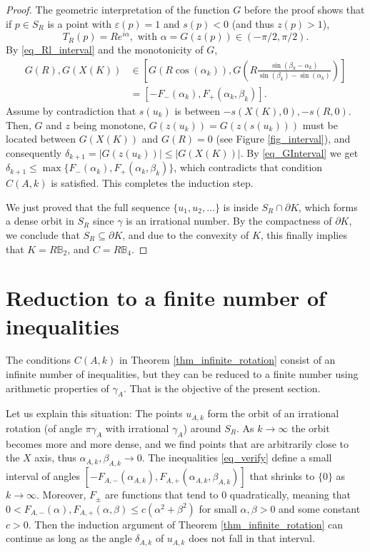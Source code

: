 \documentclass{amsart}
\def \B{\mathbb B}
\begin{document}
\begin{proof}
	The geometric interpretation of the function $G$ before the proof shows that if $p \in S_R$ is a point with $\varepsilon(p) = 1$ and $s(p)<0$ (and thus $z(p)>1$),
	\[T_R(p) = R e^{i \alpha}, \text{ with } \alpha = G(z(p)) \in (-\pi/2, \pi/2) .\]
	By \eqref{eq_Rl_interval} and the monotonicity of $G$, 
	\begin{align}
		\label{eq_GInterval}
		G(R), G(X(K)) 
		&\in [G(R \cos(\alpha_k)), G(R\frac {\sin(\beta_k-\alpha_k)}{\sin(\beta_k) - \sin(\alpha_k)})] \\
		&= [-F_-(\alpha_k), F_+(\alpha_k,\beta_k)].
	\end{align}
	Assume by contradiction that $s(u_k)$ is between $-s(X(K),0),-s(R,0)$. Then, $G$ and $z$ being monotone, $G(z(u_k)) = G(z(s(u_k)))$ must be located between $G(X(K))$ and $G(R)=0$ (see Figure \ref{fig_interval}), and consequently $\delta_{k+1} = |G(z(u_k))| \leq |G(X(K))|$.
	By \eqref{eq_GInterval} we get $\delta_{k+1} \leq \max\{F_-(\alpha_k), F_+(\alpha_k,\beta_k)\}$, which contradicts that condition $C(A,k)$ is satisfied. This completes the induction step.

	We just proved that the full sequence $\{u_1, u_2, \ldots \}$ is inside $S_R \cap \partial K$, which forms a dense orbit in $S_R$ since $\gamma$ is an irrational number.
	By the compactness of $\partial K$, we conclude that $S_R \subseteq \partial K$, and due to the convexity of $K$, this finally implies that $K = R \B_2$, and $C = R \B_4$.

\end{proof}

\section{Reduction to a finite number of inequalities}
\label{sec_finite_inequalities}
The conditions $C(A,k)$ in Theorem \ref{thm_infinite_rotation} consist of an infinite number of inequalities, but they can be reduced to a finite number using arithmetic properties of $\gamma_A$.
That is the objective of the present section.

Let us explain this situation:
The points $u_{A,k}$ form the orbit of an irrational rotation (of angle $\pi \gamma_A$ with irrational $\gamma_A$) around $S_R$.
As $k \to \infty$ the orbit becomes more and more dense, and we find points that are arbitrarily close to the $X$ axis, thus $\alpha_{A,k}, \beta_{A,k} \to 0$.
The inequalities \eqref{eq_verify} define a small interval of angles $[-F_{A,-}(\alpha_{A,k}), F_{A,+}(\alpha_{A,k},\beta_{A,k})]$ that shrinks to $\{0\}$ as $k \to \infty$.
Moreover, $F_\pm$ are functions that tend to $0$ quadratically, meaning that $0 < F_{A,-}(\alpha), F_{A,+}(\alpha, \beta) \leq c (\alpha^2 + \beta^2)$ for small $\alpha, \beta > 0$ and some constant $c>0$.
Then the induction argument of Theorem \ref{thm_infinite_rotation} can continue as long as the angle $\delta_{A,k}$ of $u_{A,k}$ does not fall in that interval.
\end{document}
